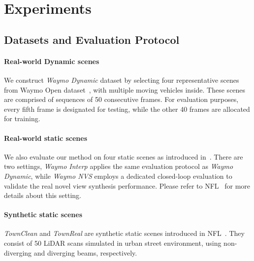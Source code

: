 \section{Experiments}

\subsection{Datasets and Evaluation Protocol}\label{sec:datasets}

\paragraph{Real-world Dynamic scenes} 
We construct \textit{Waymo Dynamic} dataset by selecting four representative scenes from Waymo Open dataset~\cite{sun2020scalability}, with multiple moving vehicles inside. These scenes are comprised of sequences of 50 consecutive frames. For evaluation purposes, every fifth frame is designated for testing, while the other 40 frames are allocated for training.


\paragraph{Real-world static scenes}
We also evaluate our method on four static scenes as introduced in~\cite{Huang2023nfl}. There are two settings, \textit{Waymo Interp} applies the same evaluation protocol as \textit{Waymo Dynamic}, while \textit{Waymo NVS} employs a dedicated closed-loop evaluation to validate the real novel view synthesis performance. Please refer to NFL~\cite{Huang2023nfl} for more details about this setting. 
 


\paragraph{Synthetic static scenes}  
\textit{TownClean} and \textit{TownReal} are synthetic static scenes introduced in NFL~\cite{Huang2023nfl}. They consist of 50 LiDAR scans simulated in urban street environment, using non-diverging and diverging beams, respectively. 



